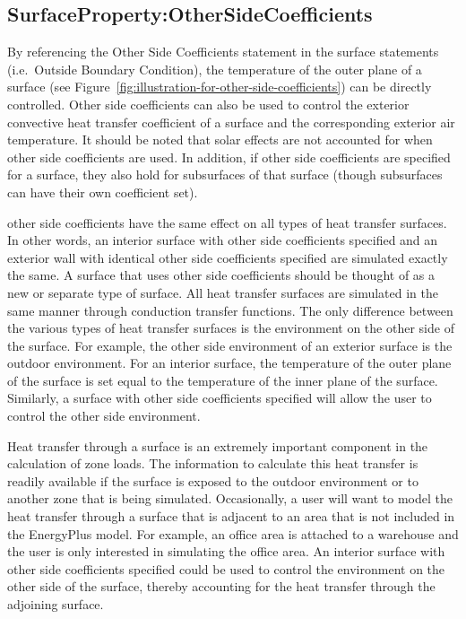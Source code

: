 \subsection{SurfaceProperty:OtherSideCoefficients}\label{surfacepropertyothersidecoefficients}

By referencing the Other Side Coefficients statement in the surface statements (i.e.~Outside Boundary Condition), the temperature of the outer plane of a surface (see Figure~\ref{fig:illustration-for-other-side-coefficients}) can be directly controlled. Other side coefficients can also be used to control the exterior convective heat transfer coefficient of a surface and the corresponding exterior air temperature. It should be noted that solar effects are not accounted for when other side coefficients are used. In addition, if other side coefficients are specified for a surface, they also hold for subsurfaces of that surface (though subsurfaces can have their own coefficient set).

other side coefficients have the same effect on all types of heat transfer surfaces. In other words, an interior surface with other side coefficients specified and an exterior wall with identical other side coefficients specified are simulated exactly the same. A surface that uses other side coefficients should be thought of as a new or separate type of surface. All heat transfer surfaces are simulated in the same manner through conduction transfer functions. The only difference between the various types of heat transfer surfaces is the environment on the other side of the surface. For example, the other side environment of an exterior surface is the outdoor environment. For an interior surface, the temperature of the outer plane of the surface is set equal to the temperature of the inner plane of the surface. Similarly, a surface with other side coefficients specified will allow the user to control the other side environment.

Heat transfer through a surface is an extremely important component in the calculation of zone loads. The information to calculate this heat transfer is readily available if the surface is exposed to the outdoor environment or to another zone that is being simulated. Occasionally, a user will want to model the heat transfer through a surface that is adjacent to an area that is not included in the EnergyPlus model. For example, an office area is attached to a warehouse and the user is only interested in simulating the office area. An interior surface with other side coefficients specified could be used to control the environment on the other side of the surface, thereby accounting for the heat transfer through the adjoining surface.

